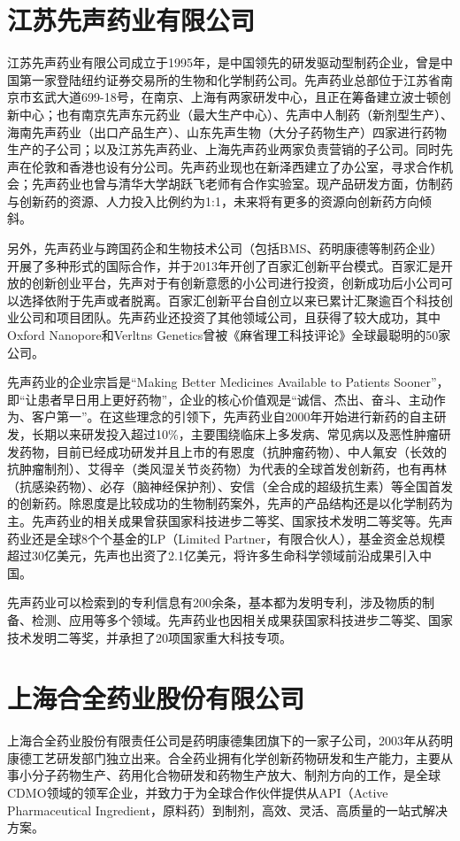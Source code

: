 \documentclass[twocolumn,openany]{ctexbook}
\begin{document}
		\section{江苏先声药业有限公司}
		
		江苏先声药业有限公司成立于1995年，是中国领先的研发驱动型制药企业，曾是中国第一家登陆纽约证券交易所的生物和化学制药公司。先声药业总部位于江苏省南京市玄武大道699-18号，在南京、上海有两家研发中心，且正在筹备建立波士顿创新中心；也有南京先声东元药业（最大生产中心）、先声中人制药（新剂型生产）、海南先声药业（出口产品生产）、山东先声生物（大分子药物生产）四家进行药物生产的子公司；以及江苏先声药业、上海先声药业两家负责营销的子公司。同时先声在伦敦和香港也设有分公司。先声药业现也在新泽西建立了办公室，寻求合作机会；先声药业也曾与清华大学胡跃飞老师有合作实验室。现产品研发方面，仿制药与创新药的资源、人力投入比例约为1:1，未来将有更多的资源向创新药方向倾斜\citep{RN34}。
		
		另外，先声药业与跨国药企和生物技术公司（包括BMS、药明康德等制药企业）开展了多种形式的国际合作，并于2013年开创了百家汇创新平台模式。百家汇是开放的创新创业平台，先声对于有创新意愿的小公司进行投资，创新成功后小公司可以选择依附于先声或者脱离。百家汇创新平台自创立以来已累计汇聚逾百个科技创业公司和项目团队。先声药业还投资了其他领域公司，且获得了较大成功，其中Oxford Nanopore和Verltns Genetics曾被《麻省理工科技评论》全球最聪明的50家公司。
		
		先声药业的企业宗旨是“Making Better Medicines Available to Patients Sooner”，即“让患者早日用上更好药物”，企业的核心价值观是“诚信、杰出、奋斗、主动作为、客户第一”。在这些理念的引领下，先声药业自2000年开始进行新药的自主研发，长期以来研发投入超过10\%，主要围绕临床上多发病、常见病以及恶性肿瘤研发药物，目前已经成功研发并且上市的有恩度（抗肿瘤药物）、中人氟安（长效的抗肿瘤制剂）、艾得辛（类风湿关节炎药物）为代表的全球首发创新药，也有再林（抗感染药物）、必存（脑神经保护剂）、安信（全合成的超级抗生素）等全国首发的创新药。除恩度是比较成功的生物制药案外，先声的产品结构还是以化学制药为主\citep{RN35}。先声药业的相关成果曾获国家科技进步二等奖、国家技术发明二等奖等。先声药业还是全球8个个基金的LP（Limited Partner，有限合伙人），基金资金总规模超过30亿美元，先声也出资了2.1亿美元，将许多生命科学领域前沿成果引入中国。
		
		
		先声药业可以检索到的专利信息有200余条，基本都为发明专利，涉及物质的制备、检测、应用等多个领域。先声药业也因相关成果获国家科技进步二等奖、国家技术发明二等奖，并承担了20项国家重大科技专项。
	
		\section{上海合全药业股份有限公司}
	上海合全药业股份有限责任公司是药明康德集团旗下的一家子公司，2003年从药明康德工艺研发部门独立出来。合全药业拥有化学创新药物研发和生产能力，主要从事小分子药物生产、药用化合物研发和药物生产放大、制剂方向的工作，是全球CDMO领域的领军企业，并致力于为全球合作伙伴提供从API（Active Pharmaceutical Ingredient，原料药）到制剂，高效、灵活、高质量的一站式解决方案。
	
\end{document}
